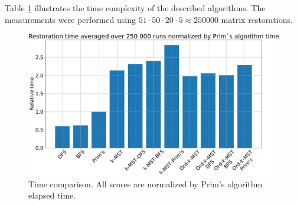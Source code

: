 \documentclass[11pt, tightenlines, twoside, onecolumn, nofloats, nobibnotes, nofootinbib, superscriptaddress, noshowpacks, centertags]{revtex4}
\begin{document}
Table \ref{fig:time} illustrates the time complexity of the described algorithms. The measurements were performed using $51\cdot 50\cdot 20\cdot5 \approx 250000$ matrix restorations.

\begin{figure}
    \centering
    \includegraphics[scale=0.35]{./img/timing_comparison.pdf}
    \caption{Time comparison. All scores are normalized by Prim's algorithm elapsed time.}
    \label{fig:time}
\end{figure}
        
      
\end{document}
